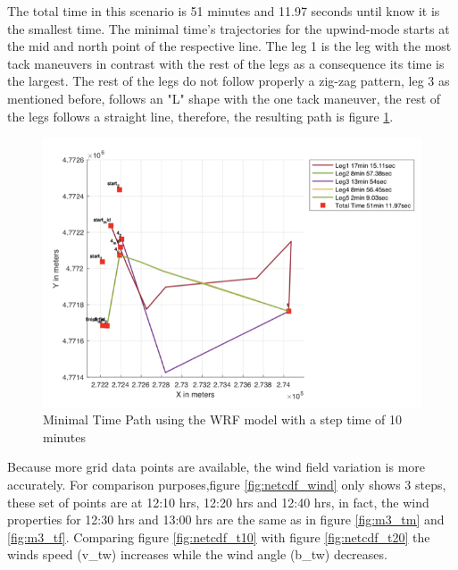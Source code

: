 The total time in this scenario is 51 minutes and 11.97 seconds until know it is the smallest time. The minimal time's trajectories for the upwind-mode starts at the mid and north point of the respective line. The leg 1 is the leg with the most tack maneuvers in contrast with the rest of the legs as a consequence its time is the largest. The rest of the legs do not follow properly a zig-zag pattern, leg 3 as mentioned before, follows an "L" shape  with the one tack maneuver, the rest of the legs follows a straight line, therefore, the resulting path is figure \ref{fig:times_windnetcdf}. \par  

\begin{figure} [hbt!]
    \centering
    \includegraphics[width=0.75 \linewidth]{images/netcdf_times.png}
    \caption{Minimal Time Path using the WRF model with a step time of 10 minutes}
    \label{fig:times_windnetcdf}
\end{figure}

Because more grid data points are available, the wind field variation is more accurately. For comparison purposes,figure \ref{fig:netcdf_wind} only shows 3 steps, these set of points are at 12:10 hrs, 12:20 hrs and 12:40 hrs, in fact, the wind properties for 12:30 hrs and 13:00 hrs are the same as in figure \ref{fig:m3_tm} and \ref{fig:m3_tf}. Comparing figure \ref{fig:netcdf_t10} with figure \ref{fig:netcdf_t20} the winds speed  (\acrshort{v_tw}) increases while the wind angle (\acrshort{b_tw}) decreases.  %

